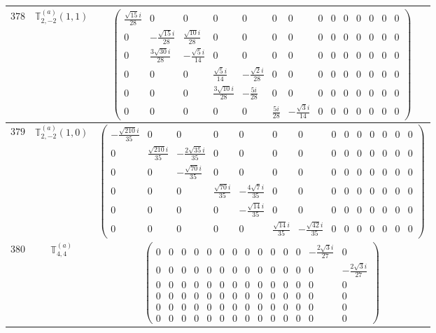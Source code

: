 \documentclass[fleqn,8pt,landscape]{jsarticle}
\begin{document}
\begin{center}
\begin{longtable}{ccc}
$ 378 $ & $ \mathbb{T}_{2,-2}^{(a)}(1,1) $ & $ \begin{pmatrix} \frac{\sqrt{15} i}{28} & 0 & 0 & 0 & 0 & 0 & 0 & 0 & 0 & 0 & 0 & 0 & 0 & 0 \\ 0 & - \frac{\sqrt{15} i}{28} & \frac{\sqrt{10} i}{28} & 0 & 0 & 0 & 0 & 0 & 0 & 0 & 0 & 0 & 0 & 0 \\ 0 & \frac{3 \sqrt{30} i}{28} & - \frac{\sqrt{5} i}{14} & 0 & 0 & 0 & 0 & 0 & 0 & 0 & 0 & 0 & 0 & 0 \\ 0 & 0 & 0 & \frac{\sqrt{5} i}{14} & - \frac{\sqrt{2} i}{28} & 0 & 0 & 0 & 0 & 0 & 0 & 0 & 0 & 0 \\ 0 & 0 & 0 & \frac{3 \sqrt{10} i}{28} & - \frac{5 i}{28} & 0 & 0 & 0 & 0 & 0 & 0 & 0 & 0 & 0 \\ 0 & 0 & 0 & 0 & 0 & \frac{5 i}{28} & - \frac{\sqrt{3} i}{14} & 0 & 0 & 0 & 0 & 0 & 0 & 0 \end{pmatrix} $ \\ \hline
$ 379 $ & $ \mathbb{T}_{2,-2}^{(a)}(1,0) $ & $ \begin{pmatrix} - \frac{\sqrt{210} i}{35} & 0 & 0 & 0 & 0 & 0 & 0 & 0 & 0 & 0 & 0 & 0 & 0 & 0 \\ 0 & \frac{\sqrt{210} i}{35} & - \frac{2 \sqrt{35} i}{35} & 0 & 0 & 0 & 0 & 0 & 0 & 0 & 0 & 0 & 0 & 0 \\ 0 & 0 & - \frac{\sqrt{70} i}{35} & 0 & 0 & 0 & 0 & 0 & 0 & 0 & 0 & 0 & 0 & 0 \\ 0 & 0 & 0 & \frac{\sqrt{70} i}{35} & - \frac{4 \sqrt{7} i}{35} & 0 & 0 & 0 & 0 & 0 & 0 & 0 & 0 & 0 \\ 0 & 0 & 0 & 0 & - \frac{\sqrt{14} i}{35} & 0 & 0 & 0 & 0 & 0 & 0 & 0 & 0 & 0 \\ 0 & 0 & 0 & 0 & 0 & \frac{\sqrt{14} i}{35} & - \frac{\sqrt{42} i}{35} & 0 & 0 & 0 & 0 & 0 & 0 & 0 \end{pmatrix} $ \\ \hline
$ 380 $ & $ \mathbb{T}_{4,4}^{(a)} $ & $ \begin{pmatrix} 0 & 0 & 0 & 0 & 0 & 0 & 0 & 0 & 0 & 0 & 0 & 0 & - \frac{2 \sqrt{3} i}{27} & 0 \\ 0 & 0 & 0 & 0 & 0 & 0 & 0 & 0 & 0 & 0 & 0 & 0 & 0 & - \frac{2 \sqrt{3} i}{27} \\ 0 & 0 & 0 & 0 & 0 & 0 & 0 & 0 & 0 & 0 & 0 & 0 & 0 & 0 \\ 0 & 0 & 0 & 0 & 0 & 0 & 0 & 0 & 0 & 0 & 0 & 0 & 0 & 0 \\ 0 & 0 & 0 & 0 & 0 & 0 & 0 & 0 & 0 & 0 & 0 & 0 & 0 & 0 \\ 0 & 0 & 0 & 0 & 0 & 0 & 0 & 0 & 0 & 0 & 0 & 0 & 0 & 0 \end{pmatrix} $ \\ \hline

\end{longtable}
\end{center}
\end{document}
